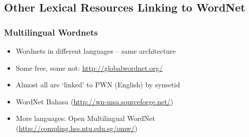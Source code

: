\subsection{Other Lexical Resources Linking to WordNet}

\begin{frame}
\frametitle{Multilingual Wordnets}
    
\begin{itemize}[<+->]
\item Wordnets in different languages -- same architecture 
\item Some free, some not: \url{http://globalwordnet.org/}
\item Almost all are `linked' to PWN (English) by \alert{synsetid}
\item WordNet Bahasa (\url{http://wn-msa.sourceforge.net/}) \parencite{Bond:etal:WordNetBahasa:2014}
\item More languages: Open Multilingual WordNet (\url{http://compling.hss.ntu.edu.sg/omw/}) \parencite{Bond:Paik:2012}
\end{itemize}

\end{frame}

